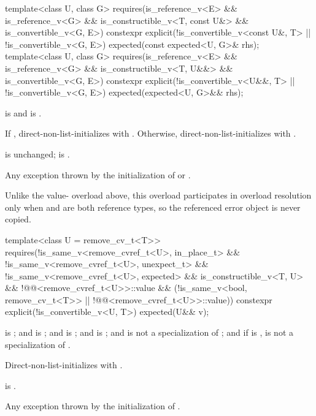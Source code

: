 %
\begin{itemdecl}
template<class U, class G>
  requires(is_reference_v<E> && is_reference_v<G> && is_constructible_v<T, const U&> &&
           is_convertible_v<G, E>)
constexpr explicit(!is_convertible_v<const U&, T> || !is_convertible_v<G, E>)
    expected(const expected<U, G>& rhs);
template<class U, class G>
  requires(is_reference_v<E> && is_reference_v<G> && is_constructible_v<T, U&&> &&
           is_convertible_v<G, E>)
constexpr explicit(!is_convertible_v<U&&, T> || !is_convertible_v<G, E>)
    expected(expected<U, G>&& rhs);
\end{itemdecl}

\begin{itemdescr}
\pnum
\constraints
{} is  and  is .

\pnum
\effects
If , direct-non-list-initializes  with . Otherwise, direct-non-list-initializes  with .

\pnum
\ensures
{} is unchanged;  is .

\pnum
\throws
Any exception thrown by the initialization of  or .

\pnum
\remarks
Unlike the value- overload above, this overload participates in overload resolution only when  and  are both reference types, so the referenced error object is never copied.
\end{itemdescr}

%
\begin{itemdecl}
template<class U = remove_cv_t<T>>
  requires(!is_same_v<remove_cvref_t<U>, in_place_t> &&
           !is_same_v<remove_cvref_t<U>, unexpect_t> &&
           !is_same_v<remove_cvref_t<U>, expected> && is_constructible_v<T, U> &&
           !@@<remove_cvref_t<U>>::value &&
           (!is_same_v<bool, remove_cv_t<T>> ||
            !@@<remove_cvref_t<U>>::value))
constexpr explicit(!is_convertible_v<U, T>) expected(U&& v);
\end{itemdecl}

\begin{itemdescr}
\pnum
\constraints
{} is ; and  is ; and  is ; and  is ; and  is not a specialization of ; and if  is ,  is not a specialization of .

\pnum
\effects
Direct-non-list-initializes  with .

\pnum
\ensures
{} is .

\pnum
\throws
Any exception thrown by the initialization of .
\end{itemdescr}

